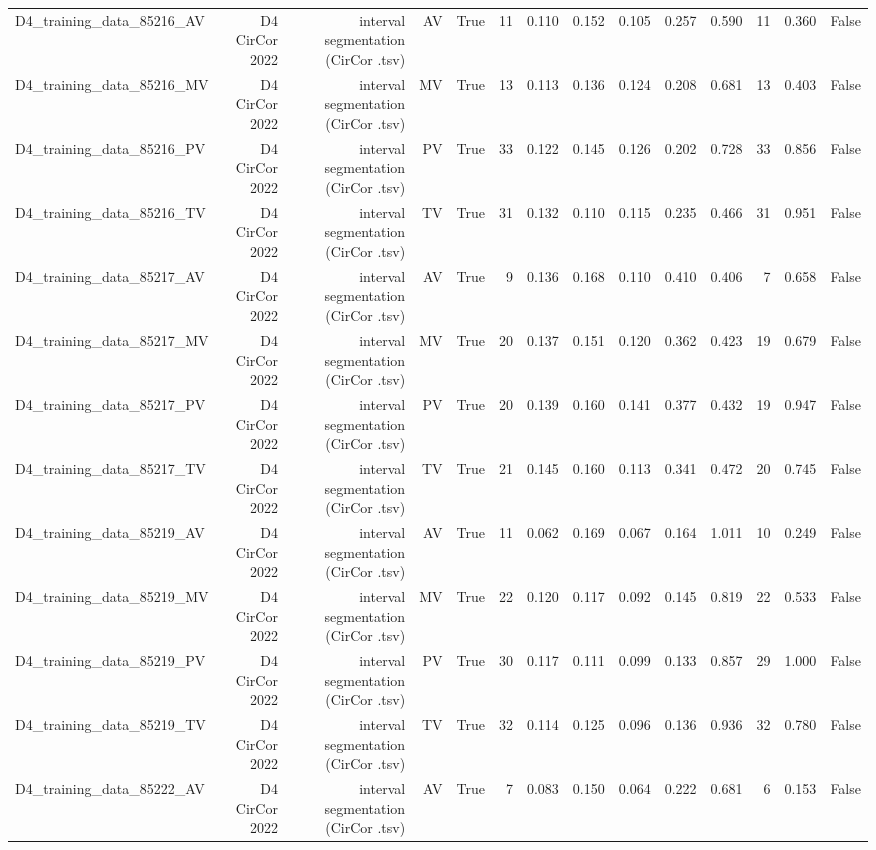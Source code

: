 \begin{table}[htbp]
\begin{tabular}{lrrrrrrrrrrrrr}
    D4\_training\_data\_85216\_AV & D4 CirCor 2022 & interval segmentation (CirCor .tsv) & AV & True & 11 & 0.110 & 0.152 & 0.105 & 0.257 & 0.590 & 11 & 0.360 & False \\
    D4\_training\_data\_85216\_MV & D4 CirCor 2022 & interval segmentation (CirCor .tsv) & MV & True & 13 & 0.113 & 0.136 & 0.124 & 0.208 & 0.681 & 13 & 0.403 & False \\
    D4\_training\_data\_85216\_PV & D4 CirCor 2022 & interval segmentation (CirCor .tsv) & PV & True & 33 & 0.122 & 0.145 & 0.126 & 0.202 & 0.728 & 33 & 0.856 & False \\
    D4\_training\_data\_85216\_TV & D4 CirCor 2022 & interval segmentation (CirCor .tsv) & TV & True & 31 & 0.132 & 0.110 & 0.115 & 0.235 & 0.466 & 31 & 0.951 & False \\
    D4\_training\_data\_85217\_AV & D4 CirCor 2022 & interval segmentation (CirCor .tsv) & AV & True & 9 & 0.136 & 0.168 & 0.110 & 0.410 & 0.406 & 7 & 0.658 & False \\
    D4\_training\_data\_85217\_MV & D4 CirCor 2022 & interval segmentation (CirCor .tsv) & MV & True & 20 & 0.137 & 0.151 & 0.120 & 0.362 & 0.423 & 19 & 0.679 & False \\
    D4\_training\_data\_85217\_PV & D4 CirCor 2022 & interval segmentation (CirCor .tsv) & PV & True & 20 & 0.139 & 0.160 & 0.141 & 0.377 & 0.432 & 19 & 0.947 & False \\
    D4\_training\_data\_85217\_TV & D4 CirCor 2022 & interval segmentation (CirCor .tsv) & TV & True & 21 & 0.145 & 0.160 & 0.113 & 0.341 & 0.472 & 20 & 0.745 & False \\
    D4\_training\_data\_85219\_AV & D4 CirCor 2022 & interval segmentation (CirCor .tsv) & AV & True & 11 & 0.062 & 0.169 & 0.067 & 0.164 & 1.011 & 10 & 0.249 & False \\
    D4\_training\_data\_85219\_MV & D4 CirCor 2022 & interval segmentation (CirCor .tsv) & MV & True & 22 & 0.120 & 0.117 & 0.092 & 0.145 & 0.819 & 22 & 0.533 & False \\
    D4\_training\_data\_85219\_PV & D4 CirCor 2022 & interval segmentation (CirCor .tsv) & PV & True & 30 & 0.117 & 0.111 & 0.099 & 0.133 & 0.857 & 29 & 1.000 & False \\
    D4\_training\_data\_85219\_TV & D4 CirCor 2022 & interval segmentation (CirCor .tsv) & TV & True & 32 & 0.114 & 0.125 & 0.096 & 0.136 & 0.936 & 32 & 0.780 & False \\
    D4\_training\_data\_85222\_AV & D4 CirCor 2022 & interval segmentation (CirCor .tsv) & AV & True & 7 & 0.083 & 0.150 & 0.064 & 0.222 & 0.681 & 6 & 0.153 & False \\

\end{tabular}
\end{table}
